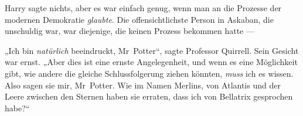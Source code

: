 Harry sagte nichts, aber es war einfach genug, wenn man an die Prozesse der modernen Demokratie \emph{glaubte}. Die offensichtlichste Person in Askaban, die unschuldig war, war diejenige, die keinen Prozess bekommen hatte —

„Ich bin \emph{natürlich} beeindruckt, Mr~Potter“, sagte Professor Quirrell. Sein Gesicht war ernst.
„Aber dies ist eine ernste Angelegenheit, und wenn es eine Möglichkeit gibt, wie andere die gleiche Schlussfolgerung ziehen könnten, \emph{muss} ich es wissen. Also sagen sie mir, Mr~Potter. Wie im Namen Merlins, von Atlantis und der Leere zwischen den Sternen haben sie erraten, dass ich von Bellatrix gesprochen habe?“

